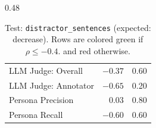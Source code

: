 \begin{table}[htbp]
\begin{subtable}[t]{0.48\textwidth}
\begin{tabular}{lrr}
\rowcolor{matchFalse} LLM Judge: Overall                    &  $-0.37$ &  0.60 \\
\rowcolor{matchTrue} LLM Judge: Annotator        &  $-0.65$ &  0.20 \\
\rowcolor{matchFalse} Persona Precision                     &   $0.03$ &  0.80 \\
\rowcolor{matchTrue} Persona Recall                        &  $-0.60$ &  0.60 \\
\bottomrule
\end{tabular}
\caption{LLM metrics}
\end{subtable}
\caption[Test: \texttt{distractor\_sentences} (expected: decrease).]{Test: \texttt{distractor\_sentences} (expected: decrease). Rows are colored green if $\rho\leq-0.4$. and red otherwise.}
\label{tab:distractor_sentences}
\end{table}



